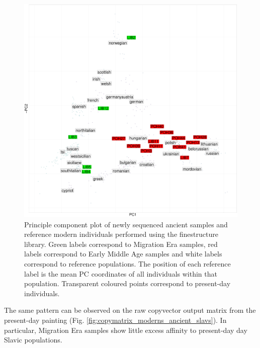 \begin{figure}[htp]
    \centering
    \includegraphics[width=1.0\textwidth]{../images/chapter5/chunklengths_moderns_ancients_PCA.pdf}
    \caption{Principle component plot of newly sequenced ancient samples and reference modern individuals performed using the finestructure library. Green labels correspond to Migration Era samples, red labels correspond to Early Middle Age samples and white labels correspond to reference populations. The position of each reference label is the mean PC coordinates of all individuals within that population. Transparent coloured points correspond to present-day individuals.}
    \label{fig:chunklengths_moderns_ancients_PCA}
\end{figure}

The same pattern can be observed on the raw copyvector output matrix from the present-day painting (Fig. \ref{fig:copymatrix_moderns_ancient_slavs}). In particular, Migration Era samples show little excess affinity to present-day day Slavic populations.

